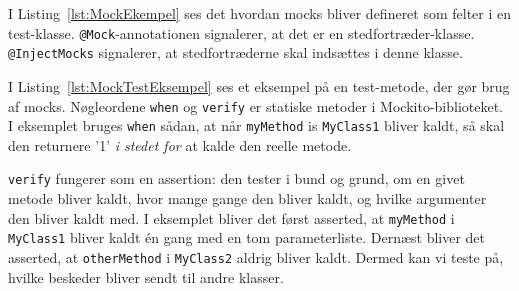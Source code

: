 I Listing~\ref{lst:MockEkempel} ses det hvordan mocks bliver defineret som felter i en test-klasse. \texttt{@Mock}-annotationen signalerer, at det er en stedfortræder-klasse. \texttt{@InjectMocks} signalerer, at stedfortræderne skal indsættes i denne klasse.

I Listing~\ref{lst:MockTestEksempel} ses et eksempel på en test-metode, der gør brug af mocks. Nøgleordene \texttt{when} og \texttt{verify} er statiske metoder i Mockito-biblioteket. I eksemplet bruges \texttt{when} sådan, at når \texttt{myMethod} is \texttt{MyClass1} bliver kaldt, så skal den returnere '1' \textit{i stedet for} at kalde den reelle metode. 



\texttt{verify} fungerer som en assertion: den tester i bund og grund, om en givet metode bliver kaldt, hvor mange gange den bliver kaldt, og hvilke argumenter den bliver kaldt med. I eksemplet bliver det først asserted, at \texttt{myMethod} i \texttt{MyClass1} bliver kaldt én gang med en tom parameterliste. Dernæst bliver det asserted, at \texttt{otherMethod} i \texttt{MyClass2} aldrig bliver kaldt. Dermed kan vi teste på, hvilke beskeder bliver sendt til andre klasser.


